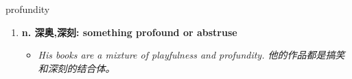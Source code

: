 
\begin{frame}
{\huge profundity}
\begin{center}
\begin{enumerate}\Large
  \item \textbf{n. 深奥,深刻: something profound or abstruse}
  \begin{itemize}
    \item \em{\Large{His books are a mixture of playfulness and profundity. 他的作品都是搞笑和深刻的结合体。}}
  \end{itemize}
\end{enumerate}
\end{center}
\end{frame}
